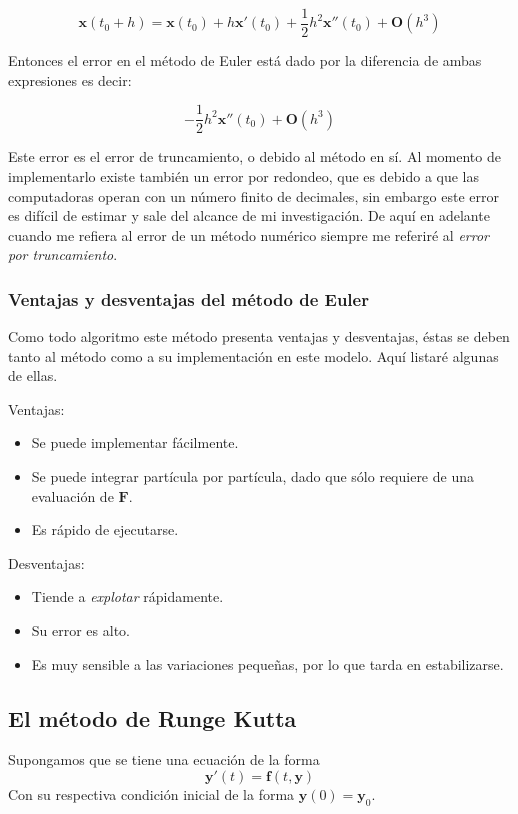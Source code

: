 $$\textbf{x}(t_0 + h) = \textbf{x}(t_0) + h \textbf{x}'(t_0) + \frac{1}{2}h^2\textbf{x}''(t_0) + \textbf{O}(h^3)$$

Entonces el error en el método de Euler está dado por la diferencia de ambas expresiones es decir:

$$-\frac{1}{2}h^2\textbf{x}''(t_0) + \textbf{O}(h^3)$$

Este error es el error de truncamiento, o debido al método en sí.
Al momento de implementarlo existe también un error por redondeo, que es debido a que las computadoras operan con un número finito de decimales, sin embargo este error es difícil de estimar y sale del alcance de mi investigación.
De aquí en adelante cuando me refiera al error de un método numérico siempre me referiré al \emph{error por truncamiento}.

\subsubsection{Ventajas y desventajas del método de Euler}

Como todo algoritmo este método presenta ventajas y desventajas, éstas se deben tanto al método como a su implementación en este modelo.
Aquí listaré algunas de ellas.

Ventajas:
\begin{itemize}
\item Se puede implementar fácilmente.
\item Se puede integrar partícula por partícula, dado que sólo requiere de una evaluación de $\textbf{F}$.
\item Es rápido de ejecutarse.
\end{itemize}

Desventajas:
\begin{itemize}
\item Tiende a \emph{explotar} rápidamente.
\item Su error es alto.
\item Es muy sensible a las variaciones pequeñas, por lo que tarda en estabilizarse.
\end{itemize}

\subsection{El método de Runge Kutta}
Supongamos que se tiene una ecuación de la forma
$$\textbf{y}'(t) = \textbf{f}(t, \textbf{y})$$
Con su respectiva condición inicial de la forma $\textbf{y}(0)=\textbf{y}_0$.

